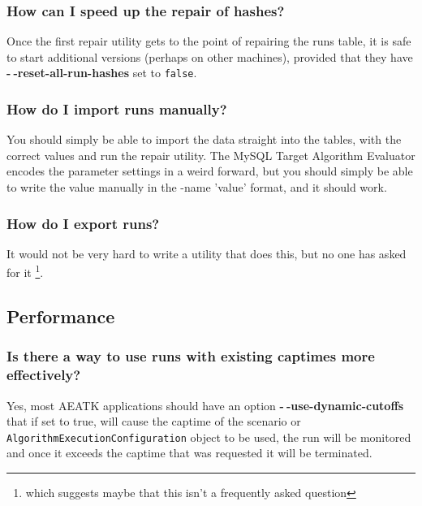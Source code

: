 \documentclass[11pt,letterpaper,oneside]{article}
\begin{document}
\subsubsection{How can I speed up the repair of hashes?}

Once the first repair utility gets to the point of repairing the runs table, it is safe to start additional versions (perhaps on other machines), provided that they have \textbf{-$~\!$-reset-all-run-hashes} set to \texttt{false}. 

\subsubsection{How do I import runs manually?}

You should simply be able to import the data straight into the tables, with the correct values and run the repair utility. The MySQL Target Algorithm Evaluator encodes the parameter settings in a weird forward, but you should simply be able to write the value manually in the -name 'value' format, and it should work. 

\subsubsection{How do I export runs?}

It would not be very hard to write a utility that does this, but no one has asked for it \footnote{which suggests maybe that this isn't a frequently asked question}.

\subsection{Performance}

\subsubsection{Is there a way to use runs with existing captimes more effectively?}

Yes, most AEATK applications should have an option \textbf{-$~\!$-use-dynamic-cutoffs} that if set to true, will cause the captime of the scenario or \texttt{AlgorithmExecutionConfiguration} object to be used, the run will be monitored and once it exceeds the captime that was requested it will be terminated. 
\end{document}

